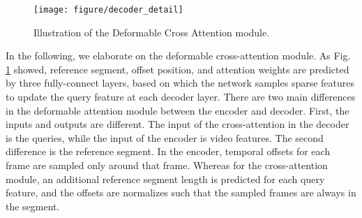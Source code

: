 \documentclass[runningheads]{llncs}
\newcommand{\figref}[1]{Fig. \ref{#1}}
\begin{document}
\begin{figure}[]
    \centering
    \setlength{\abovecaptionskip}{-0.2cm}
    \texttt{[image: figure/decoder\_detail]}
  \caption{Illustration of the Deformable Cross Attention module.}
  \label{decoder}
  \vspace{-0.5cm}
\end{figure}

In the following, we elaborate on the deformable cross-attention module.
As \figref{decoder} showed, reference segment, offset position, and attention weights are predicted by three fully-connect layers, based on which the network samples sparse features to update the query feature at each decoder layer. There are two main differences in the deformable attention module between the encoder and decoder. 
First, the inputs and outputs are different. The input of the cross-attention in the decoder is the queries, while the input of the encoder is video features. The second difference is the reference segment. In the encoder, temporal offsets for each frame are sampled only around that frame. Whereas for the cross-attention module, an additional reference segment length is predicted for each query feature, and the offsets are normalizes such that the sampled frames are always in the segment. 
\end{document}

